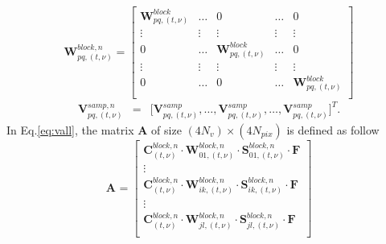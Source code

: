 \documentclass[useAMS,usenatbib]{mn2e}
\begin{document}
\begin{equation*}
\mathbf{W}_{pq,(t,\nu)}^{block,n}=
  \begin{bmatrix}
    \mathbf{W}_{pq,(t,\nu)}^{block} &\dots & 0 & \dots & 0\\
    \vdots & \vdots & \vdots & \vdots & \vdots\\
    0 & \dots& \mathbf{W}_{pq,(t,\nu)}^{block} &\dots & 0\\
    \vdots & \vdots & \vdots & \vdots & \vdots \\
    0 & \dots& 0 &\dots & \mathbf{W}_{pq,(t,\nu)}^{block}\\
  \end{bmatrix}
\end{equation*}
\begin{eqnarray*}
\mathbf{V}_{pq,(t,\nu)}^{samp,n}&=&\Bigg[\mathbf{V}_{pq,(t,\nu)}^{samp},\dots, \mathbf{V}_{pq,(t,\nu)}^{samp}, \dots,
\mathbf{V}_{pq,(t,\nu)}^{samp}\Bigg]^T. 
\end{eqnarray*}
In Eq.\ref{eq:vall}, the matrix $\mathbf{A}$ of size $(4N_v)\times (4N_{pix})$ is defined as follow
\begin{equation*}
\mathbf{A}_{}=
  \begin{bmatrix}
    \mathbf{C}_{(t,\nu)}^{block,n}\cdot \mathbf{W}_{01,(t,\nu)}^{block,n}\cdot \mathbf{S}_{01,(t,\nu)}^{block,n} \cdot\mathbf{F}\\
    \vdots\\
    \mathbf{C}_{(t,\nu)}^{block,n}\cdot \mathbf{W}_{ik,(t,\nu)}^{block,n}\cdot \mathbf{S}_{ik,(t,\nu)}^{block,n} \cdot\mathbf{F}\\
    \vdots \\
    \mathbf{C}_{(t,\nu)}^{block,n}\cdot \mathbf{W}_{jl,(t,\nu)}^{block,n}\cdot \mathbf{S}_{jl,(t,\nu)}^{block,n} \cdot\mathbf{F}\\
  \end{bmatrix}
\end{equation*}
\\
\\
\\
\\
\end{document}
